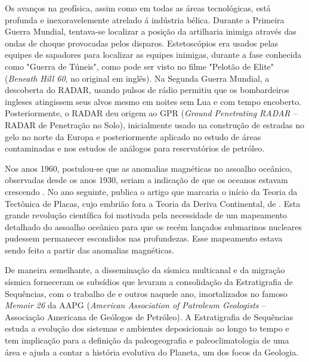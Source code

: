 \documentclass[0000]{subfiles}
\begin{document}
Os avan\c{c}os na geof\'isica, assim como em todas as \'areas tecnol\'ogicas, est\'a profunda e inexoravelemente atrelado \'a ind\'ustria b\'elica.
Durante a Primeira Guerra Mundial, tentava-se localizar a posi\c{c}\~ao da artilharia inimiga atrav\'es das ondas de choque provocadas pelos disparos.
Estetosc\'opios era usados pelas equipes de sapadores para localizar as equipes inimigas, durante a fase conhecida como "Guerra de T\'uneis", como pode ser visto no filme "Pelot\~ao de Elite" \citep{sims_2010} (\emph{Beneath Hill 60}, no original em ingl\^es).
Na Segunda Guerra Mundial, a descoberta do RADAR, usando pulsos de r\'adio permitiu que os bombardeiros ingleses atingissem seus alvos mesmo em noites sem Lua e com tempo encoberto.
Posteriormente, o RADAR deu origem ao GPR (\emph{Ground Penetrating RADAR} -- RADAR de Penetra\c{c}\~ao no Solo), inicialmente usado na constru\c{c}\~ao de estradas no gelo no norte da Europa e posteriormente aplicado no estudo de \'areas contaminadas e nos estudos de an\'alogos para reservat\'orios de petr\'oleo.

Nos anos 1960, postulou-se que as anomalias magn\'eticas no assoalho oce\^anico, observadas desde os anos 1930, seriam a indica\c{c}\~ao de que os oceanos estavam crescendo \citep{vine_1965}. 
No ano seguinte, \citeauthor{wilson_1966} publica o artigo que marcaria o in\'icio da Teoria da Tect\^onica de Placas, cujo embri\~ao fora a Teoria da Deriva Continental, de \citet{van_der_gracht_theory_1928}.
Esta grande revolu\c{c}\~ao cient\'ifica foi motivada pela necessidade de um mapeamento detalhado do assoalho oce\^anico para que os rec\'em lan\c{c}ados submarinos nucleares pudessem permanecer escondidos nas profundezas.
Esse mapeamento estava sendo feito a partir das anomalias magn\'eticas.

De maneira semelhante, a dissemina\c{c}\~ao da s\'ismica multicanal e da migra\c{c}\~ao s\'ismica forneceram os subs\'idios que levaram a consolida\c{c}\~ao da Estratigrafia de Sequ\^encias, com o trabalho de \citeauthor{mitchum_seismic_1977} e outros naquele ano, imortalizados no famoso \emph{Memoir 26} da AAPG (\emph{American Association of Patroleum Geologists} -- Associa\c{c}\~ao Americana de Ge\'ologos de Petr\'oleo).
A Estratigrafia de Sequ\^encias estuda a evolu\c{c}\~ao dos sistemas e ambientes deposicionais ao longo to tempo e tem implica\c{c}\~ao para a defini\c{c}\~ao da paleogeografia e paleoclimatologia de uma \'area e ajuda a contar a hist\'oria evolutiva do Planeta, um dos focos da Geologia.
\end{document}
